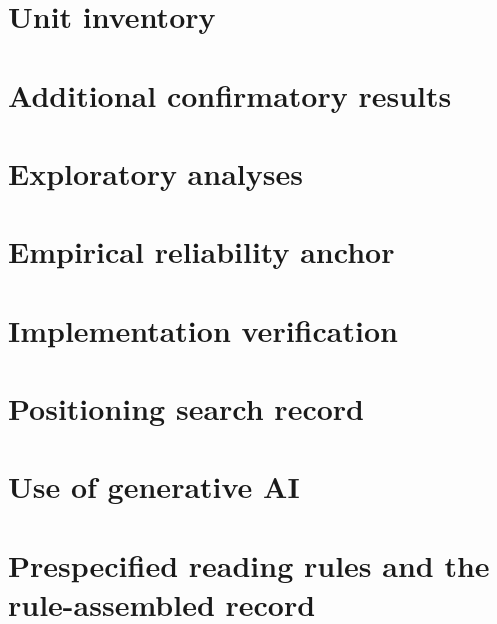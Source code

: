 \documentclass[pdflatex,sn-mathphys-num]{sn-jnl}
\begin{document}
\section{Unit inventory}\label{sec:inventory}


\section{Additional confirmatory results}\label{sec:additional}


\section{Exploratory analyses}\label{sec:exploratory}


\section{Empirical reliability anchor}\label{sec:shp}


\section{Implementation verification}\label{sec:verification}


\section{Positioning search record}\label{sec:search}


\section{Use of generative AI}\label{sec:ai}


\section{Prespecified reading rules and the rule-assembled record}\label{sec:rule-record}



\end{document}
